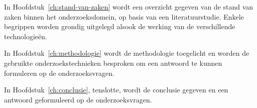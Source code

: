 In Hoofdstuk~\ref{ch:stand-van-zaken} wordt een overzicht gegeven van de stand van zaken binnen het onderzoeksdomein, op basis van een literatuurstudie. Enkele begrippen worden grondig uitgelegd alsook de werking van de verschillende technologieën.

In Hoofdstuk~\ref{ch:methodologie} wordt de methodologie toegelicht en worden de gebruikte onderzoekstechnieken besproken om een antwoord te kunnen formuleren op de onderzoeksvragen.


In Hoofdstuk~\ref{ch:conclusie}, tenslotte, wordt de conclusie gegeven en een antwoord geformuleerd op de onderzoeksvragen. 

